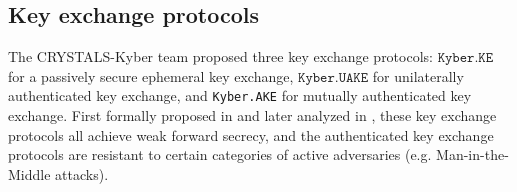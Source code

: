 \documentclass[journal=tches,submission]{iacrtrans}
\newcommand{\keygen}{\texttt{KeyGen}}
\newcommand{\encap}{\texttt{Encap}}
\newcommand{\decap}{\texttt{Decap}}
\newcommand{\pk}{\texttt{pk}}
\newcommand{\sk}{\texttt{sk}}
\begin{document}
\begin{table}[h]
\end{table}

\subsection{Key exchange protocols}\label{sec:key-exchange-protocols}
The CRYSTALS-Kyber team \cite{DBLP:conf/eurosp/BosDKLLSSSS18} proposed three key exchange protocols: $\texttt{Kyber.KE}$ for a passively secure ephemeral key exchange, $\texttt{Kyber.UAKE}$ for unilaterally authenticated key exchange, and \texttt{Kyber.AKE} for mutually authenticated key exchange. First formally proposed in \cite{DBLP:conf/stoc/BellareCK98} and later analyzed in \cite{DBLP:conf/eurocrypt/CanettiK01}, these key exchange protocols all achieve weak forward secrecy, and the authenticated key exchange protocols are resistant to certain categories of active adversaries (e.g. Man-in-the-Middle attacks).
\end{document}
